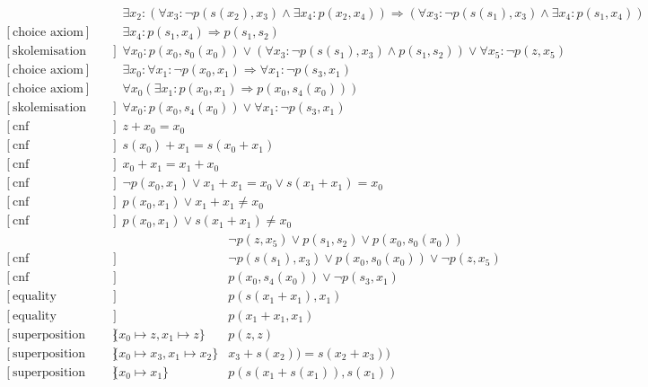 \documentclass[onehalfspacing]{article}
\begin{document}
\begin{landscape}
\begin{align}
		[\text{choice axiom}] &&	 \exists x_2 : (\forall x_3 : \neg p(s(x_2),x_3) \wedge \exists x_4 : p(x_2,x_4)) \Rightarrow (\forall x_3 : \neg p(s(s_1),x_3) \wedge \exists x_4 : p(s_1,x_4)) \\
		[\text{choice axiom}] &&	 \exists x_4 : p(s_1,x_4) \Rightarrow p(s_1,s_2) \\
		[\text{skolemisation 13,16,15,14}] &&	 \forall x_0 : p(x_0,s_0(x_0)) \vee (\forall x_3 : \neg p(s(s_1),x_3) \wedge p(s_1,s_2)) \vee \forall x_5 : \neg p(z,x_5) \\
		[\text{choice axiom}] &&	 \exists x_0 : \forall x_1 : \neg p(x_0,x_1) \Rightarrow \forall x_1 : \neg p(s_3,x_1) \\
		[\text{choice axiom}] &&     \forall x_0(\exists x_1: p(x_0, x_1)\Rightarrow p(x_0, s_4(x_0)))\\
		[\text{skolemisation 9,17,18}] &&	 \forall x_0: p(x_0, s_4(x_0))\vee\forall x_1 : \neg p(s_3,x_1) \\
		[\text{cnf transformation 1}] &&	 z + x_0 = x_0 \\
		[\text{cnf transformation 2}] &&	 s(x_0) + x_1 = s(x_0 + x_1) \\
		[\text{cnf transformation 3}] &&	 x_0 + x_1 = x_1 + x_0 \\
		[\text{cnf transformation 11}] &&	 \neg p(x_0,x_1) \vee x_1 + x_1 = x_0 \vee s(x_1 + x_1) = x_0 \\
		[\text{cnf transformation 11}] &&	 p(x_0,x_1) \vee x_1 + x_1 \neq x_0 \\
		[\text{cnf transformation 11}] &&	 p(x_0,x_1) \vee s(x_1 + x_1) \neq x_0
	\end{align}
	\begin{align}
		[\text{cnf transformation 17}] &&	 \neg p(z,x_5) \vee p(s_1,s_2) \vee p(x_0,s_0(x_0)) \\
		[\text{cnf transformation 17}] &&	 \neg p(s(s_1),x_3) \vee p(x_0,s_0(x_0)) \vee \neg p(z,x_5) \\
		[\text{cnf transformation 20}] &&	 p(x_0, s_4(x_0))\vee\neg p(s_3,x_1) \\
		[\text{equality resolution 26}] &&	 p(s(x_1 + x_1),x_1) \\
		[\text{equality resolution 25}] &&	 p(x_1 + x_1,x_1) \\
		[\text{superposition 31,21}] &\{x_0\mapsto z, x_1\mapsto z\}&	 p(z,z) \\
		[\text{superposition 22,23}] &\{x_0\mapsto x_3, x_1\mapsto x_2\}&	 x_3 + s(x_2)) = s(x_2+x_3)) \\
		[\text{superposition 31,22}] &\{x_0\mapsto x_1\}&	 p(s(x_1+s(x_1)),s(x_1)) \\

\end{align}
\end{landscape}
\end{document}

